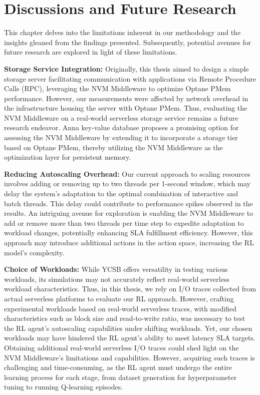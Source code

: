 \chapter{Discussions and Future Research}

This chapter delves into the limitations inherent in our methodology and the insights gleaned from the findings presented. Subsequently, potential avenues for future research are explored in light of these limitations.

\textbf{Storage Service Integration:} Originally, this thesis aimed to design a simple storage server facilitating communication with applications via Remote Procedure Calls (RPC), leveraging the NVM Middleware to optimize Optane PMem performance. However, our measurements were affected by network overhead in the infrastructure housing the server with Optane PMem. Thus, evaluating the NVM Middleware on a real-world serverless storage service remains a future research endeavor. Anna key-value database \cite{wu2019anna} proposes a promising option for assessing the NVM Middleware by extending it to incorporate a storage tier based on Optane PMem, thereby utilizing the NVM Middleware as the optimization layer for persistent memory.

\textbf{Reducing Autoscaling Overhead:} Our current approach to scaling resources involves adding or removing up to two threads per 1-second window, which may delay the system's adaptation to the optimal combination of interactive and batch threads. This delay could contribute to performance spikes observed in the results. An intriguing avenue for exploration is enabling the NVM Middleware to add or remove more than two threads per time step to expedite adaptation to workload changes, potentially enhancing SLA fulfillment efficiency. However, this approach may introduce additional actions in the action space, increasing the RL model's complexity.

\textbf{Choice of Workloads:} While YCSB offers versatility in testing various workloads, its simulations may not accurately reflect real-world serverless workload characteristics. Thus, in this thesis, we rely on I/O traces collected from actual serverless platforms to evaluate our RL approach. However, crafting experimental workloads based on real-world serverless traces, with modified characteristics such as block size and read-to-write ratio, was necessary to test the RL agent's autoscaling capabilities under shifting workloads. Yet, our chosen workloads may have hindered the RL agent's ability to meet latency SLA targets. Obtaining additional real-world serverless I/O traces could shed light on the NVM Middleware's limitations and capabilities. However, acquiring such traces is challenging and time-consuming, as the RL agent must undergo the entire learning process for each stage, from dataset generation for hyperparameter tuning to running Q-learning episodes.

